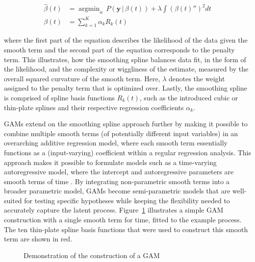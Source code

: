 \documentclass[man, floatsintext]{apa7}
\DeclareMathOperator*{\argmin}{argmin}
\begin{document}
\begin{equation}
  \begin{aligned}
    \hat{\beta}(t) & = \argmin_\alpha \, P(\textbf{y} \, | \, \beta(t)) +
    \lambda \int {(\beta(t)'')}^2 dt                                      \\
    \beta(t)       & = \sum^K_{k = 1} \alpha_k R_k(t)
  \end{aligned}
\end{equation}

\noindent where the first part of the equation describes the likelihood of the
data given the smooth term and the second part of the equation corresponds to
the penalty term. This illustrates, how the smoothing spline balances data fit,
in the form of the likelihood, and the complexity or wiggliness of the
estimate, measured by the overall squared curvature of the smooth term. Here,
$\lambda$ denotes the weight assigned to the penalty term that is optimized
over. Lastly, the smoothing spline is comprised of spline basis functions
$R_k(t)$, such as the introduced cubic or thin-plate splines and their
respective regression coefficients $\alpha_k$.

GAMs extend on the smoothing spline approach further by making it possible to
combine multiple smooth terms (of potentially different input variables) in an
overarching additive regression model, where each smooth term essentially
functions as a (input-varying) coefficient within a regular regression
analysis. This approach makes it possible to formulate models such as a
time-varying autoregressive model, where the intercept and autoregressive
parameters are smooth terms of time \parencite{bringmann_changing_2017,
  bringmann_modeling_2015}. By integrating non-parametric smooth terms into a
broader parametric model, GAMs become semi-parametric models that are
well-suited for testing specific hypotheses while keeping the flexibility
needed to accurately capture the latent process. Figure~\ref{fig:gam_dem}
illustrates a simple GAM construction with a single smooth term for time,
fitted to the example process. The ten thin-plate spline basis functions that
were used to construct this smooth term are shown in red.

\begin{figure}[!t]
  \caption{Demonstration of the construction of a GAM}
  \label{fig:gam_dem}
\end{figure}
\end{document}
